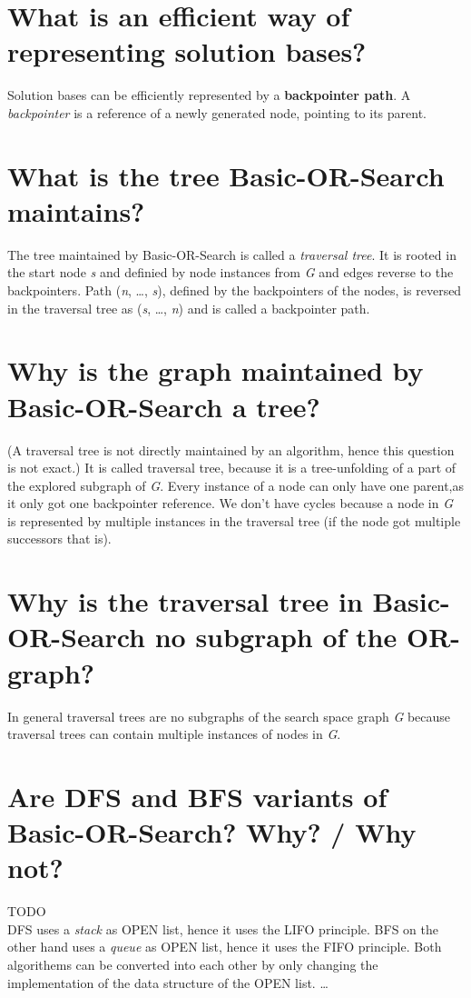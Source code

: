 \documentclass[12pt, a4paper]{article}
\begin{document}
\section{What is an efficient way of representing solution bases?}
Solution bases can be efficiently represented by a \textbf{backpointer path}. A \textit{backpointer} is a reference of a newly generated node, pointing to its parent.

\section{What is the tree Basic-OR-Search maintains?}
The tree maintained by Basic-OR-Search is called a \textit{traversal tree}. It is rooted in the start node \textit{s} and definied by node instances from \textit{G} and edges reverse to the backpointers. Path (\textit{n}, \ldots, \textit{s}), defined by the backpointers of the nodes, is reversed in the traversal tree as (\textit{s}, \ldots, \textit{n}) and is called a backpointer path.

\section{Why is the graph maintained by Basic-OR-Search a tree?}
(A traversal tree is not directly maintained by an algorithm, hence this question is not exact.) It is called traversal tree, because it is a tree-unfolding of a part of the explored subgraph of \textit{G}. Every instance of a node can only have one parent,as it only got one backpointer reference. We don't have cycles because a node in \textit{G} is represented by multiple instances in the traversal tree (if the node got multiple successors that is).

\section{Why is the traversal tree in Basic-OR-Search no subgraph of the OR-graph?}
In general traversal trees are no subgraphs of the  search space graph \textit{G} because traversal trees can contain multiple instances of nodes in \textit{G}.

\section{Are DFS and BFS variants of Basic-OR-Search? Why? / Why not?}
TODO \\
DFS uses a \textit{stack} as OPEN list, hence it uses the LIFO principle.
BFS on the other hand uses a \textit{queue} as OPEN list, hence it uses the FIFO principle.
Both algorithems can be converted into each other by only changing the implementation of the data structure of the OPEN list.
\ldots
\end{document}
